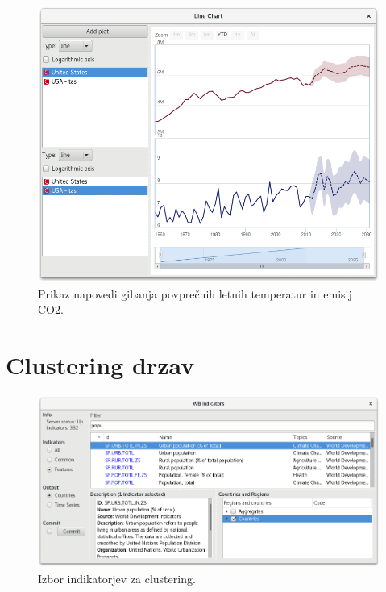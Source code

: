 \begin{figure}
\begin{center}
\includegraphics[width=12cm]{pic/var_forecast_graph.png}
\end{center}
\caption{Prikaz napovedi gibanja povprečnih letnih temperatur in emisij CO2.}
\label{var_forecast_graph}
\end{figure} 




\section{Clustering drzav }



\begin{figure}
\begin{center}
\includegraphics[width=12cm]{pic/cluster_indicators.png}
\end{center}
\caption{Izbor indikatorjev za clustering.}
\label{cluster_indicators}
\end{figure} 

